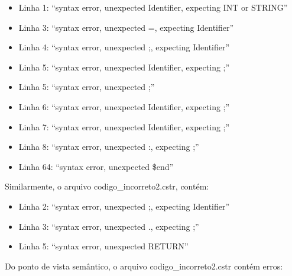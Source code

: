 \documentclass[12pt]{article}
\begin{document}
\begin{itemize}
	\item Linha 1: ``syntax error, unexpected Identifier, expecting INT or STRING''
	\item Linha 3: ``syntax error, unexpected =, expecting Identifier''
	\item Linha 4: ``syntax error, unexpected ;, expecting Identifier''
	\item Linha 5: ``syntax error, unexpected Identifier, expecting ;''
	\item Linha 5: ``syntax error, unexpected ;''
	\item Linha 6: ``syntax error, unexpected Identifier, expecting ;''
	\item Linha 7: ``syntax error, unexpected Identifier, expecting ;''
	\item Linha 8: ``syntax error, unexpected :, expecting ;''
	\item Linha 64: ``syntax error, unexpected \$end''\\
\end{itemize}


Similarmente, o arquivo codigo\_incorreto2.cstr, contém:

\begin{itemize}
	\item Linha 2: ``syntax error, unexpected ;, expecting Identifier''
	\item Linha 3: ``syntax error, unexpected ., expecting ;''
	\item Linha 5: ``syntax error, unexpected RETURN''\\
\end{itemize}

Do ponto de vista semântico, o arquivo codigo\_incorreto2.cstr contém erros:
\end{document}
